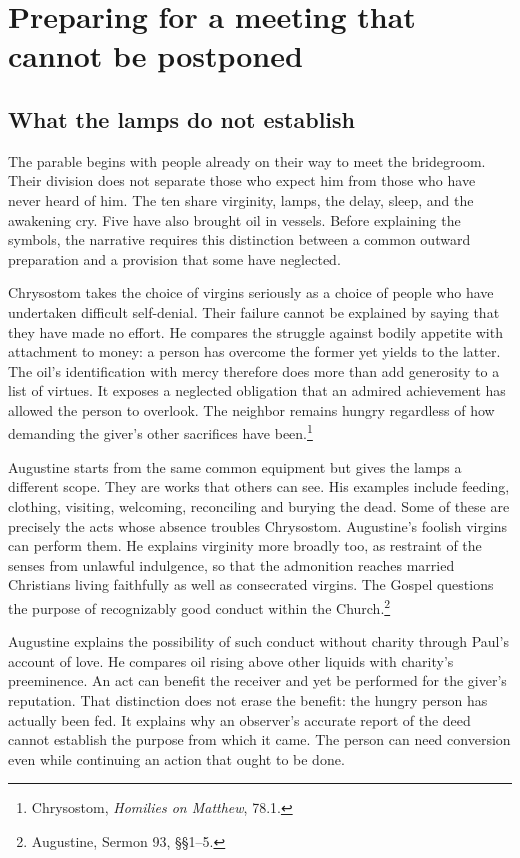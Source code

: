 \section{Preparing for a meeting that cannot be postponed}
\subsection{What the lamps do not establish}
The parable begins with people already on their way to meet the bridegroom. Their division does not separate those who expect him from those who have never heard of him. The ten share virginity, lamps, the delay, sleep, and the awakening cry. Five have also brought oil in vessels. Before explaining the symbols, the narrative requires this distinction between a common outward preparation and a provision that some have neglected.

Chrysostom takes the choice of virgins seriously as a choice of people who have undertaken difficult self-denial. Their failure cannot be explained by saying that they have made no effort. He compares the struggle against bodily appetite with attachment to money: a person has overcome the former yet yields to the latter. The oil's identification with mercy therefore does more than add generosity to a list of virtues. It exposes a neglected obligation that an admired achievement has allowed the person to overlook. The neighbor remains hungry regardless of how demanding the giver's other sacrifices have been.\footnote{Chrysostom, \textit{Homilies on Matthew}, 78.1.}

Augustine starts from the same common equipment but gives the lamps a different scope. They are works that others can see. His examples include feeding, clothing, visiting, welcoming, reconciling and burying the dead. Some of these are precisely the acts whose absence troubles Chrysostom. Augustine's foolish virgins can perform them. He explains virginity more broadly too, as restraint of the senses from unlawful indulgence, so that the admonition reaches married Christians living faithfully as well as consecrated virgins. The Gospel questions the purpose of recognizably good conduct within the Church.\footnote{Augustine, Sermon 93, §§1--5.}

Augustine explains the possibility of such conduct without charity through Paul's account of love. He compares oil rising above other liquids with charity's preeminence. An act can benefit the receiver and yet be performed for the giver's reputation. That distinction does not erase the benefit: the hungry person has actually been fed. It explains why an observer's accurate report of the deed cannot establish the purpose from which it came. The person can need conversion even while continuing an action that ought to be done.

